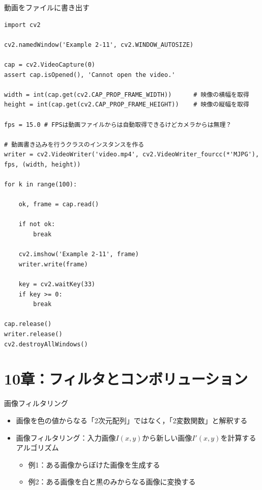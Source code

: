 \documentclass[10pt]{beamer}
\begin{document}
	\begin{frame}[fragile]{動画をファイルに書き出す}
	    \tiny
	    \begin{verbatim}
import cv2

cv2.namedWindow('Example 2-11', cv2.WINDOW_AUTOSIZE)

cap = cv2.VideoCapture(0)
assert cap.isOpened(), 'Cannot open the video.'

width = int(cap.get(cv2.CAP_PROP_FRAME_WIDTH))      # 映像の横幅を取得
height = int(cap.get(cv2.CAP_PROP_FRAME_HEIGHT))    # 映像の縦幅を取得

fps = 15.0 # FPSは動画ファイルからは自動取得できるけどカメラからは無理？

# 動画書き込みを行うクラスのインスタンスを作る
writer = cv2.VideoWriter('video.mp4', cv2.VideoWriter_fourcc(*'MJPG'), fps, (width, height))

for k in range(100):
    
    ok, frame = cap.read()
    
    if not ok:
        break
    
    cv2.imshow('Example 2-11', frame)
    writer.write(frame)
    
    key = cv2.waitKey(33)
    if key >= 0:
        break

cap.release()
writer.release()
cv2.destroyAllWindows()
	    \end{verbatim}
	\end{frame}
	
	\section{10章：フィルタとコンボリューション}
	
	\begin{frame}{画像フィルタリング}
		\begin{itemize}
			\item 画像を色の値からなる「2次元配列」ではなく，「2変数関数」と解釈する
			\item 画像フィルタリング：入力画像$I(x, y)$から新しい画像$I'(x, y)$を計算するアルゴリズム
				\begin{itemize}
					\item 例1：ある画像からぼけた画像を生成する
					\item 例2：ある画像を白と黒のみからなる画像に変換する
				\end{itemize}
		\end{itemize}
	\end{frame}
	
\end{document}
